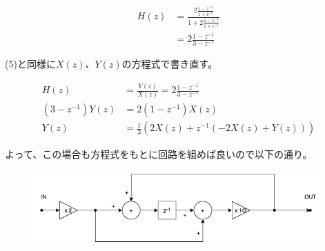 \documentclass[a4paper,12pt,xelatex,ja=standard]{bxjsarticle}
\begin{document}
\begin{equation*}
  \begin{split}
    H(z)
      &= \frac{2 \frac{1 - z^{-1}}{1 + z^{-1}}}{1 + 2 \frac{1 - z^{-1}}{1 + z^{-1}}} \\
      &= 2 \frac{1 - z^{-1}}{3 - z^{-1}}
  \end{split}
\end{equation*}

(5)と同様に$X(z)$、$Y(z)$の方程式で書き直す。

\begin{equation*}
  \begin{split}
    H(z) &= \frac{Y(z)}{X(z)} = 2 \frac{1 - z^{-1}}{3 - z^{-1}}\\
    (3-z^{-1})Y(z) &= 2 (1 - z^{-1})X(z) \\
    Y(z) &= \frac{1}{3}(2 X(z) + z^{-1}(-2 X(z) + Y(z)))
  \end{split}
\end{equation*}

よって、この場合も方程式をもとに回路を組めば良いので以下の通り。

\begin{figure}[H]
  \centering
  \includegraphics[width=11cm]{images/2018_6_circuit.png}
\end{figure}
\end{document}
